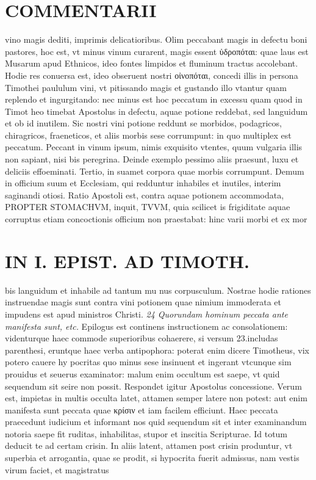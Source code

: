 \documentclass{article}
\begin{document}
\begin{pages}
\section*{COMMENTARII }
\marginpar{[ p.140 ]}\pstart vino magis dediti, imprimis delicatioribus. Olim peccabant magis in defectu boni pastores, hoc est, vt minus vinum curarent, magis essent ὑδροπόται: quae laus est Musarum apud Ethnicos, ideo fontes limpidos et fluminum tractus accolebant. Hodie res conuersa est, ideo obseruent nostri οἰνοπόται, concedi illis in persona Timothei paululum vini, vt pitissando magis et gustando illo vtantur quam replendo et ingurgitando: nec minus est hoc peccatum in excessu quam quod in Timot heo timebat Apostolus in defectu, aquae potione reddebat, sed languidum et ob id inutilem. Sic nostri vini potione reddunt se morbidos, podagricos, chiragricos, fraeneticos, et aliis morbis sese corrumpunt: in quo multiplex est peccatum. Peccant in vinum ipsum, nimis exquisito vtentes, quum vulgaria illis non sapiant, nisi bis peregrina. Deinde exemplo pessimo aliis praesunt, luxu et deliciis effoeminati. Tertio, in suamet corpora quae morbis corrumpunt. Demum in officium suum et Ecclesiam, qui redduntur inhabiles et inutiles, interim saginandi otiosi.  \pend\pstart Ratio Apostoli est, contra aquae potionem accommodata, PROPTER STOMACHVM, inquit, TVVM, quia scilicet is frigiditate aquae corruptus etiam concoctionis officium non praestabat: hinc varii morbi et ex mor\pend
\section*{IN I. EPIST. AD TIMOTH. }
\marginpar{[ p.141 ]}\pstart bis languidum et inhabile ad tantum mu nus corpusculum. Nostrae hodie rationes instruendae magis sunt contra vini potionem quae nimium immoderata et impudens est apud ministros Christi.  \pend
\textit{24 Quorundam hominum peccata ante manifesta sunt, etc. }\pstart Epilogus est continens instructionem ac consolationem: videnturque haec commode superioribus cohaerere, si versum 23.includas parenthesi, eruntque haec verba antipophora: poterat enim dicere Timotheus, vix potero cauere hy pocritas quo minus sese insinuent et ingerant vtcunque sim prouidus et seuerus examinator: malum enim occultum est saepe, vt quid sequendum sit seire non possit. Respondet igitur Apostolus concessione. Verum est, impietas in multis occulta latet, attamen semper latere non potest: aut enim manifesta sunt peccata quae κρίσιν et iam facilem efficiunt.  \pend\pstart Haec peccata praecedunt iudicium et informant nos quid sequendum sit et inter examinandum notoria saepe fit ruditas, inhabilitas, stupor et inscitia Scripturae. Id totum deducit te ad certam crisin. In aliis latent, attamen post crisin produntur, vt superbia et arrogantia, quae se prodit, si hypocrita fuerit admissus, nam vestis virum faciet, et magistratus  \pend

\end{pages}
\end{document}

